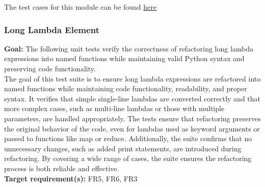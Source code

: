 \documentclass[12pt, titlepage]{article}
\begin{document}
  \noindent The test cases for this module can be found
  \href{https://github.com/ssm-lab/capstone--source-code-optimizer/blob/main/tests/refactorers/test_long_message_chain_refactoring.py}{here}

  \subsubsection{Long Lambda Element}

  \textbf{Goal:} The following unit tests verify the correctness of
  refactoring long lambda expressions into named functions while
  maintaining valid Python syntax and preserving code functionality.\\

  \noindent The goal of this test suite is to ensure long lambda
  expressions are refactored into named
  functions while maintaining code functionality, readability, and
  proper syntax. It verifies
  that simple single-line lambdas are converted correctly and that
  more complex cases, such as
  multi-line lambdas or those with multiple parameters, are handled
  appropriately. The tests
  ensure that refactoring preserves the original behavior of the
  code, even for lambdas used
  as keyword arguments or passed to functions like map or reduce.
  Additionally, the suite
  confirms that no unnecessary changes, such as added print
  statements, are introduced during
  refactoring. By covering a wide range of cases, the suite ensures
  the refactoring process
  is both reliable and effective.\\

  \noindent \textbf{Target requirement(s):} FR5, FR6, FR3 ~\cite{SRS} \\
\end{document}
